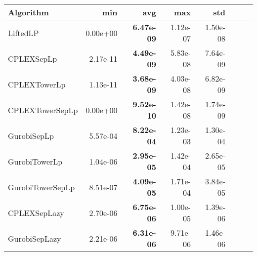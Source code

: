 \begin{tabular}{lrrrrrrr}
Algorithm & min & avg & max & std
\\
\hline
LiftedLP&0.00e+00& \bf6.47e-09& 1.12e-07& 1.50e-08\\
CPLEXSepLp&2.17e-11& \bf4.49e-09& 5.83e-08& 7.64e-09\\
CPLEXTowerLp&1.13e-11& \bf3.68e-09& 4.03e-08& 6.82e-09\\
CPLEXTowerSepLp&0.00e+00& \bf9.52e-10& 1.42e-08& 1.74e-09\\
GurobiSepLp&5.57e-04& \bf8.22e-04& 1.23e-03& 1.30e-04\\
GurobiTowerLp&1.04e-06& \bf2.95e-05& 1.42e-04& 2.65e-05\\
GurobiTowerSepLp&8.51e-07& \bf4.09e-05& 1.71e-04& 3.84e-05\\
CPLEXSepLazy&2.70e-06& \bf6.75e-06& 1.00e-05& 1.39e-06\\
GurobiSepLazy&2.21e-06& \bf6.31e-06& 9.71e-06& 1.46e-06
\end{tabular}
